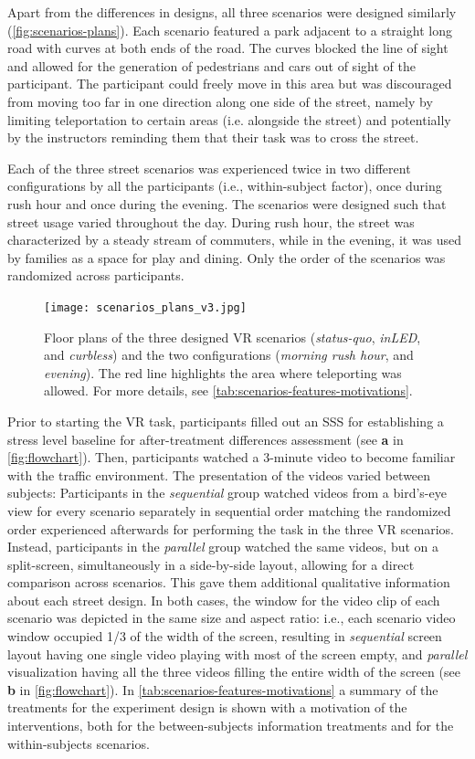 Apart from the differences in designs, all three scenarios were designed similarly (\autoref{fig:scenarios-plans}). Each scenario featured a park adjacent to a straight long road with curves at both ends of the road. The curves blocked the line of sight and allowed for the generation of pedestrians and cars out of sight of the participant. The participant could freely move in this area but was discouraged from moving too far in one direction along one side of the street, namely by limiting teleportation to certain areas (i.e. alongside the street) and potentially by the instructors reminding them that their task was to cross the street. 

Each of the three street scenarios was experienced twice in two different configurations by all the participants (i.e., within-subject factor), once during rush hour and once during the evening. The scenarios were designed such that street usage varied throughout the day. During rush hour, the street was characterized by a steady stream of commuters, while in the evening, it was used by families as a space for play and dining. Only the order of the scenarios was randomized across participants.

\begin{figure}[hb!]
\centering
\texttt{[image: scenarios\_plans\_v3.jpg]}
\caption{Floor plans of the three designed VR scenarios (\emph{status-quo}, \emph{inLED}, and \emph{curbless}) and the two configurations (\emph{morning rush hour}, and \emph{evening}). The red line highlights the area where teleporting was allowed. For more details, see \autoref{tab:scenarios-features-motivations}.}
\label{fig:scenarios-plans}
\end{figure}

Prior to starting the VR task, participants filled out an SSS for establishing a stress level baseline for after-treatment differences assessment (see \textbf{a} in \autoref{fig:flowchart}). Then, participants watched a 3-minute video to become familiar with the traffic environment. The presentation of the videos varied between subjects: 
Participants in the \emph{sequential} group watched videos from a bird's-eye view for every scenario separately in sequential order matching the randomized order experienced afterwards for performing the task in the three VR scenarios.
Instead, participants in the \emph{parallel} group watched the same videos, but on a split-screen, simultaneously in a side-by-side layout, allowing for a direct comparison across scenarios. This gave them additional qualitative information about each street design.
In both cases, the window for the video clip of each scenario was depicted in the same size and aspect ratio: i.e., each scenario video window occupied 1/3 of the width of the screen, resulting in \emph{sequential} screen layout having one single video playing with most of the screen empty, and \emph{parallel} visualization having all the three videos filling the entire width of the screen (see \textbf{b} in \autoref{fig:flowchart}). In \autoref{tab:scenarios-features-motivations} a summary of the treatments for the experiment design is shown with a motivation of the interventions, both for the between-subjects information treatments and for the within-subjects scenarios.

